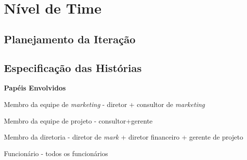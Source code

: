 \chapter[Nível de Time]{Nível de Time}

\section{Planejamento da Iteração}

\section{Especificação das Histórias}

\textbf{Papéis Envolvidos}

Membro da equipe de \textit{marketing} - diretor + consultor de \textit{marketing}

Membro da equipe de projeto - consultor+gerente

Membro da diretoria - diretor de \textit{mark} + diretor financeiro + gerente de projeto

Funcionário - todos os funcionários

